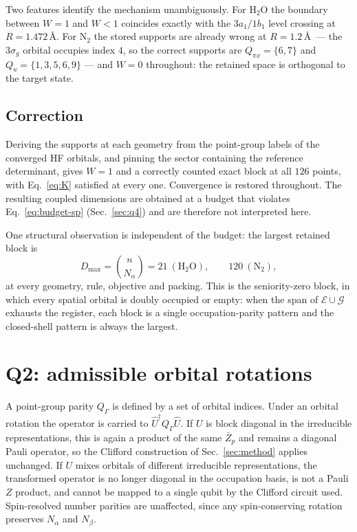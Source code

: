 \documentclass[11pt]{article}
\newcommand{\Uh}{\widehat U}
\newcommand{\Ecal}{\mathcal E}
\newcommand{\Gcal}{\mathcal G}
\newcommand{\Zb}{\bar Z}
\newcommand{\Dmax}{D_{\max}}
\begin{document}
Two features identify the mechanism unambiguously. For $\mathrm{H_2O}$ the
boundary between $W=1$ and $W<1$ coincides exactly with the $3a_1/1b_1$ level
crossing at $R=1.472$\,\AA. For $\mathrm{N_2}$ the stored supports are already
wrong at $R=1.2$\,\AA\ --- the $3\sigma_g$ orbital occupies index $4$, so the
correct supports are $Q_{\pi x}=\{6,7\}$ and $Q_u=\{1,3,5,6,9\}$ --- and $W=0$
throughout: the retained space is orthogonal to the target state.

\subsection{Correction}
Deriving the supports at each geometry from the point-group labels of the
converged HF orbitals, and pinning the sector containing the reference
determinant, gives $W=1$ and a correctly counted exact block at all $126$
points, with Eq.~\eqref{eq:K} satisfied at every one. Convergence is restored
throughout. The resulting coupled dimensions are obtained at a budget that
violates Eq.~\eqref{eq:budget-sp} (Sec.~\ref{sec:q4}) and are therefore not
interpreted here.

One structural observation is independent of the budget: the largest retained
block is
\begin{equation}
\Dmax=\binom{n}{N_\alpha}=21\ (\mathrm{H_2O}),\qquad 120\ (\mathrm{N_2}),
\end{equation}
at every geometry, rule, objective and packing. This is the seniority-zero
block, in which every spatial orbital is doubly occupied or empty: when the
span of $\Ecal\cup\Gcal$ exhausts the register, each block is a single
occupation-parity pattern and the closed-shell pattern is always the largest.

\section{Q2: admissible orbital rotations}
\label{sec:q2}

A point-group parity $Q_\Gamma$ is defined by a set of orbital indices. Under
an orbital rotation the operator is carried to $\Uh^{\dagger}Q_\Gamma\Uh$. If
$U$ is block diagonal in the irreducible representations, this is again a
product of the same $\Zb_p$ and remains a diagonal Pauli operator, so the
Clifford construction of Sec.~\ref{sec:method} applies unchanged. If $U$ mixes
orbitals of different irreducible representations, the transformed operator is
no longer diagonal in the occupation basis, is not a Pauli $Z$ product, and
cannot be mapped to a single qubit by the Clifford circuit used. Spin-resolved
number parities are unaffected, since any spin-conserving rotation preserves
$N_\alpha$ and $N_\beta$.
\end{document}
